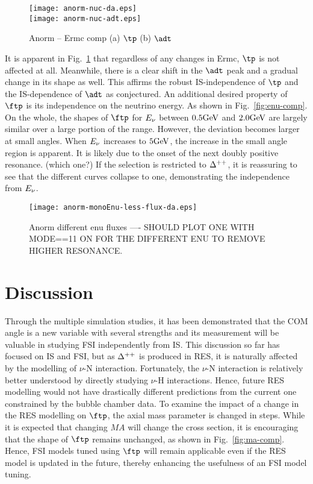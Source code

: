\begin{figure}
    \centering
    \texttt{[image: anorm-nuc-da.eps]}\\
    \texttt{[image: anorm-nuc-adt.eps]}
    \caption{Anorm – Ermc comp (a) $\tp$ (b) $\adt$}
    \label{fig:ermc-comp}
\end{figure}


It is apparent in Fig.~\ref{fig:ermc-comp} that regardless of any changes in Ermc, $\tp$ is not affected at all. Meanwhile, there is a clear shift in the $\adt$ peak and a gradual change in its shape as well. This affirms the robust IS-independence of $\tp$ and the IS-dependence of $\adt$ as conjectured.
An additional desired property of $\ftp$ is its independence on the neutrino energy. As shown in Fig.~\ref{fig:enu-comp}. On the whole, the shapes of $\ftp$ for $E_{\nu}$ between $0.5\textrm{GeV}$ and $2.0\textrm{GeV}$ are largely similar over a large portion of the range. However, the deviation becomes larger at small angles. When $E_{\nu}$ increases to $5\textrm{GeV}$, the increase in the small angle region is apparent. It is likely due to the onset of the next doubly positive resonance. (which one?) If the selection is restricted to $\Delta^{++}$, it is reassuring to see that the different curves collapse to one, demonstrating the independence from $E_{\nu}$. 

\begin{figure}
    \centering
    \texttt{[image: anorm-monoEnu-less-flux-da.eps]}
    \caption{Anorm different enu fluxes ---- SHOULD PLOT ONE WITH MODE==11 ON FOR THE DIFFERENT ENU TO REMOVE HIGHER RESONANCE.}
    \label{fig:enter-label}
\end{figure}

\section{Discussion}
Through the multiple simulation studies, it has been demonstrated that the COM angle is a new variable with several strengths and its measurement will be valuable in studying FSI independently from IS. This discussion so far has focused on IS and FSI, but as $\Delta^{++}$ is produced in RES, it is naturally affected by the modelling of $\nu$-N interaction. Fortunately, the $\nu$-N interaction is relatively better understood by directly studying $\nu$-H interactions. Hence, future RES modelling would not have drastically different predictions from the current one constrained by the bubble chamber data. To examine the impact of a change in the RES modelling on $\ftp$, the axial mass parameter is changed in steps. While it is expected that changing $MA$ will change the cross section, it is encouraging that the shape of $\ftp$ remains unchanged, as shown in Fig.~\ref{fig:ma-comp}. Hence, FSI models tuned using $\ftp$ will remain applicable even if the RES model is updated in the future, thereby enhancing the usefulness of an FSI model tuning. 

